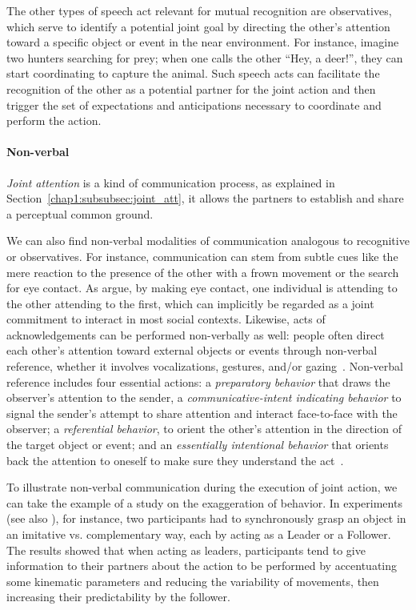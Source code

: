 \documentclass[a4paper,11pt,twoside]{StyleThese}
\begin{document}
The other types of speech act relevant for mutual recognition are observatives, which serve to identify a potential joint goal by directing the other’s attention toward a specific object or event in the near environment. For instance, imagine two hunters searching for prey; when one calls the other ``Hey, a deer!'', they can start coordinating to capture the animal. Such speech acts can facilitate the recognition of the other as a potential partner for the joint action and then trigger the set of expectations and anticipations necessary to coordinate and perform the action.

\paragraph{Non-verbal} \emph{Joint attention} is a kind of communication process, as explained in Section~\ref{chap1:subsubsec:joint_att}, it allows the partners to establish and share a perceptual common ground.

We can also find non-verbal modalities of communication analogous to recognitive or observatives. For instance, communication can stem from subtle cues like the mere reaction to the presence of the other with a frown movement or the search for eye contact. As \cite{brinck_2018_mutual} argue, by making eye contact, one individual is attending to the other attending to the first, which can implicitly be regarded as a joint commitment to interact in most social contexts. Likewise, acts of acknowledgements can be performed non-verbally as well: people often direct each other's attention toward external objects or events through non-verbal reference, whether it involves vocalizations, gestures, and/or gazing~\citep{bates_1979_emergence, leavens_2004_referential, brinck_2008_role}. Non-verbal reference includes four essential actions: a \emph{preparatory behavior} that draws the observer’s attention to the sender, a \emph{communicative-intent indicating behavior} to signal the sender’s attempt to share attention and interact face-to-face with the observer; a \emph{referential behavior}, to orient the other’s attention in the direction of the target object or event; and an \emph{essentially intentional behavior} that orients back the attention to oneself to make sure they understand the act~\cite[p.~122-123]{brinck_2008_role}.

To illustrate non-verbal communication during the execution of joint action, we can take the example of a study on the exaggeration of behavior. In \cite{sacheli_2013_kinematics} experiments (see also \cite{vesper_2014_strategic}), for instance, two participants had to synchronously grasp an object in an imitative vs. complementary way, each by acting as a Leader or a Follower. The results showed that when acting as leaders, participants tend to give information to their partners about the action to be performed by accentuating some kinematic parameters and reducing the variability of movements, then increasing their predictability by the follower. 
\end{document}
